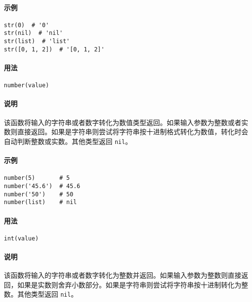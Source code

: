 \paragraph{示例}
\begin{lstlisting}[language=berry, numbers=none]
str(0)  # '0'
str(nil)  # 'nil'
str(list)  # 'list'
str([0, 1, 2])  # '[0, 1, 2]'
\end{lstlisting}


\paragraph{用法}
\begin{lstlisting}[language=berry, numbers=none]
number(value)
\end{lstlisting}

\paragraph{说明}
该函数将输入的字符串或者数字转化为数值类型返回。如果输入参数为整数或者实数则直接返回。如果是字符串则尝试将字符串按十进制格式转化为数值，转化时会自动判断整数或实数。其他类型返回 \texttt{nil}。

\paragraph{示例}
\begin{lstlisting}[language=berry, numbers=none]
number(5)       # 5
number('45.6')  # 45.6
number('50')    # 50
number(list)    # nil
\end{lstlisting}


\paragraph{用法}
\begin{lstlisting}[language=berry, numbers=none]
int(value)
\end{lstlisting}

\paragraph{说明}
该函数将输入的字符串或者数字转化为整数并返回。如果输入参数为整数则直接返回，如果是实数则舍弃小数部分。如果是字符串则尝试将字符串按十进制转化为整数。其他类型返回 \texttt{nil}。

